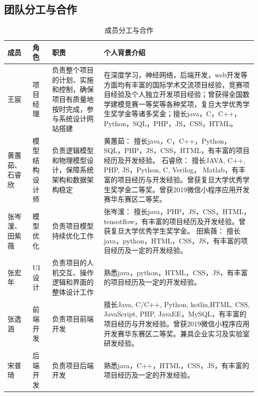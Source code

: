 \documentclass[
  hyperref, a4paper]{ctexart}
\begin{document}
\hypertarget{ux56e2ux961fux5206ux5de5ux4e0eux5408ux4f5c}{%
\subsection{团队分工与合作}\label{ux56e2ux961fux5206ux5de5ux4e0eux5408ux4f5c}}

\begin{table}[H]
\small 
\begin{center}  
\begin{tabular}{|p{1.5cm}|p{3cm}|p{5cm}||p{5cm}|}  
\hline 
成员 & 角色 & 职责 & 个人背景介绍    \\ \hline  
王宸 & 项目经理 & 负责整个项目的计划、实施和控制，确保项目有质量地按时完成，参与系统设计网站搭建 
& 在深度学习，神经网络，后端开发，web开发等方面均有丰富的国际学术交流项目经验，竞赛项目经验及个人独立开发项目经验；曾获得全国数学建模竞赛一等奖等各种奖项，复旦大学优秀学生奖学金等诸多奖金；擅长java，C，C++，Python，SQL，PHP，JS，CSS，HTML。    \\ \hline
黄蕙茹、石睿欣  & 模型结构设计师&负责逻辑模型和物理模型设计，保障系统架构和数据架构稳定 &黄蕙茹：
擅长java，C，C++，Python，SQL，PHP，JS，CSS，HTML，有丰富的项目经历及开发经验。
石睿欣： 擅长JAVA, C++, PHP, JS，Python, C, Verilog， Matlab，有丰富的项目经历与开发经验。曾获复旦大学优秀学生奖学金二等奖。曾获2019微信小程序应用开发赛华东赛区二等奖。    \\ \hline
张岑湲、田紫薇& 模型优化 & 负责项目模型持续优化工作 & 张岑湲：
擅长java，PHP，JS，CSS，HTML，tensotflow，有丰富的项目经历及开发经验。曾获复旦大学优秀学生奖学金。 田紫薇：
擅长java，python，HTML，CSS，JS，有丰富的项目经历及一定的开发经验。\\ \hline
张宏年 & UI设计 & 负责项目的人机交互、操作逻辑和界面的整体设计工作 & 
熟悉java，python，HTML，CSS，JS，有丰富的项目经历及一定的开发经验。\\ \hline
张逸涵 & 前端开发 & 负责项目前端开发 & 擅长Java, C/C++, Python, kotlin,HTML, CSS, JavaScript, PHP, JavaEE，MySQL，有丰富的项目经历与开发经验。曾获2019微信小程序应用开发赛华东赛区二等奖。兼具企业实习及实验室研发经验。 \\ \hline
宋普琦 & 后端开发 & 负责项目后端开发 & 熟悉java，C++，HTML，CSS，JS，有丰富的项目经历及一定的开发经验。 \\ \hline


\end{tabular}  
\caption{成员分工与合作} 
\end{center}  
\end{table}
\end{document}
